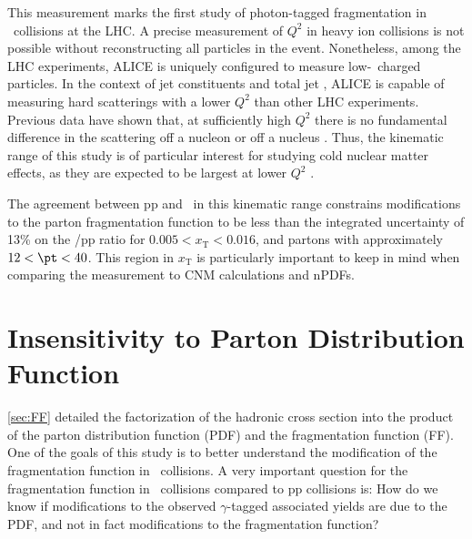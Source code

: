 This measurement marks the first study of photon-tagged fragmentation in \pPb~collisions at the LHC. A precise measurement of $Q^2$ in heavy ion collisions is not possible without reconstructing all particles in the event. Nonetheless, among the LHC experiments, ALICE is uniquely configured to measure low-\pt~charged particles. In the context of jet constituents and total jet \pt, ALICE is capable of measuring hard scatterings with a lower $Q^{2}$ than other LHC experiments. Previous data have shown that, at sufficiently high $Q^2$ there is no fundamental difference in the scattering off a nucleon or off a nucleus \cite{epps16:2017,ALTARELLI1977298}. Thus, the kinematic range of this study is of particular interest for studying cold nuclear matter effects, as they are expected to be largest at lower $Q^{2}$ \cite{epps16:2017}. 

The agreement between pp and \pPb~in this kinematic range constrains modifications to the parton fragmentation function to be less than the integrated uncertainty of 13\% on the \pPb/pp ratio for $ 0.005 < x_{\mathrm{T}} < 0.016$, and partons with approximately $12 < \pt < 40$\GeVc. This region in $x_\mathrm{T}$ is particularly important to keep in mind when comparing the measurement to CNM calculations and nPDFs.

\section{Insensitivity to Parton Distribution Function}
\label{sec:insensitivity}
\ref{sec:FF} detailed the factorization of the hadronic cross section into the product of the parton distribution function (PDF) and the fragmentation function (FF). One of the goals of this study is to better understand the modification of the fragmentation function in \pPb~collisions. A very important question for the fragmentation function in \pPb~collisions compared to pp collisions is: How do we know if modifications to the observed $\gamma$-tagged associated yields are due to the PDF, and not in fact modifications to the fragmentation function?

